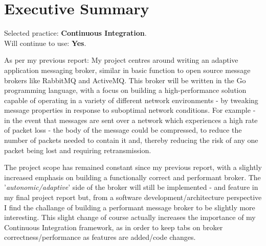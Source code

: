 \section{Executive Summary}
\label{sec:Executive Summary}

Selected practice: \textbf{Continuous Integration}.\\
Will continue to use: \textbf{Yes}.

As per my previous report: My project centres around writing an adaptive
application messaging broker, similar in basic function to open source message
brokers like RabbitMQ and ActiveMQ. This broker will be written in the Go
programming language, with a focus on building a high-performance solution
capable of operating in a variety of different network environments - by
tweaking message properties in response to suboptimal network conditions.
For example - in the event that messages are sent over a network which
experiences a high rate of packet loss - the body of the message could be
compressed, to reduce the number of packets needed to contain it and, thereby
reducing the risk of any one packet being lost and requiring retransmission.

The project scope has remained constant since my previous report, with a
slightly increased emphasis on building a functionally correct and performant
broker. The '\emph{autonomic/adaptive}' side of the broker will still be
implemented - and feature in my final project report but, from a software
development/architecture perspective I find the challange of building a
performant message broker to be slightly more interesting. This slight change of
course actually increases the importance of my Continuous Integration framework,
as in order to keep tabs on broker correctness/performance as features are added/code
changes.
